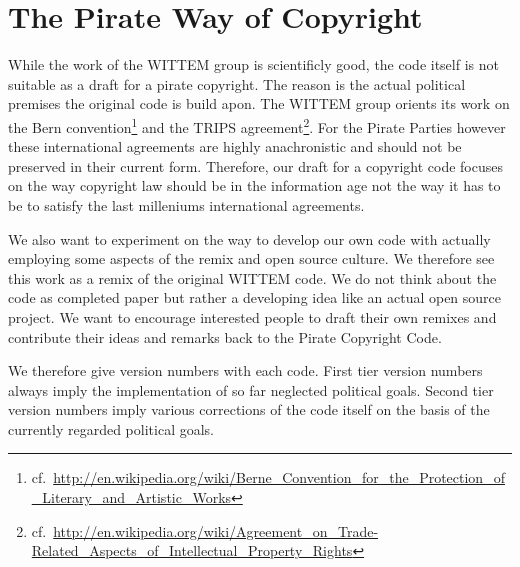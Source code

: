 \section{The Pirate Way of Copyright}

While the work of the WITTEM group is scientificly good, the code itself is not suitable as a draft for a pirate copyright. The reason is the actual political premises the original code is build apon. The WITTEM group orients its work on the Bern convention\footnote{cf.~\url{http://en.wikipedia.org/wiki/Berne_Convention_for_the_Protection_of_Literary_and_Artistic_Works}} and the TRIPS agreement\footnote{cf.~\url{http://en.wikipedia.org/wiki/Agreement_on_Trade-Related_Aspects_of_Intellectual_Property_Rights}}. For the Pirate Parties however these international agreements are highly anachronistic and should not be preserved in their current form. Therefore, our draft for a copyright code focuses on the way copyright law should be in the information age not the way it has to be to satisfy the last milleniums international agreements.

We also want to experiment on the way to develop our own code with actually employing some aspects of the remix and open source culture. We therefore see this work as a remix of the original WITTEM code. We do not think about the code as completed paper but rather a developing idea like an actual open source project. We want to encourage interested people to draft their own remixes and contribute their ideas and remarks back to the Pirate Copyright Code.

We therefore give version numbers with each code. First tier version numbers always imply the implementation of so far neglected political goals. Second tier version numbers imply various corrections of the code itself on the basis of the currently regarded political goals.